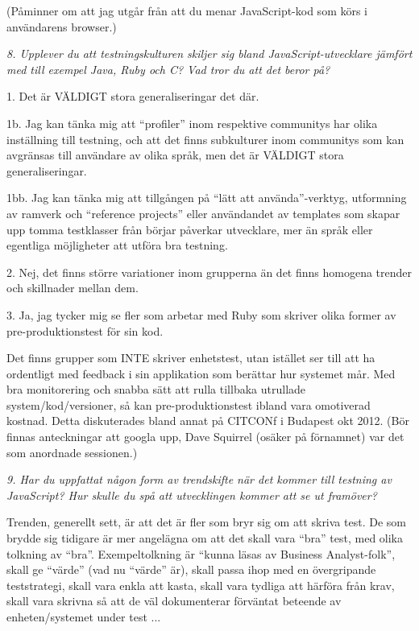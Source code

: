 \documentclass[11pt]{article}
\begin{document}
(Påminner om att jag utgår från att du menar JavaScript-kod som körs i
användarens browser.)

\emph{8. Upplever du att testningskulturen skiljer sig bland
JavaScript-utvecklare jämfört med till exempel Java, Ruby och C\nolinebreak\hspace{-.05em}\raisebox{.3ex}{\scriptsize\bf \#}? Vad
tror du att det beror på?}

1. Det är VÄLDIGT stora generaliseringar det där.

1b. Jag kan tänka mig att ``profiler'' inom respektive communitys har
olika inställning till testning, och att det finns subkulturer inom
communitys som kan avgränsas till användare av olika språk, men det är
VÄLDIGT stora generaliseringar.

1bb. Jag kan tänka mig att tillgången på ``lätt att använda''-verktyg,
utformning av ramverk och ``reference projects'' eller användandet av
templates som skapar upp tomma testklasser från börjar påverkar
utvecklare, mer än språk eller egentliga möjligheter att utföra bra
testning.

2. Nej, det finns större variationer inom grupperna än det finns
homogena trender och skillnader mellan dem.

3. Ja, jag tycker mig se fler som arbetar med Ruby som skriver olika
former av pre-produktionstest för sin kod.

Det finns grupper som INTE skriver enhetstest, utan istället ser till
att ha ordentligt med feedback i sin applikation som berättar hur
systemet mår. Med bra monitorering och snabba sätt att rulla tillbaka
utrullade system/kod/versioner, så kan pre-produktionstest ibland vara
omotiverad kostnad. Detta diskuterades bland annat på CITCONf i Budapest
okt 2012. (Bör finnas anteckningar att googla upp, Dave Squirrel (osäker
på förnamnet) var det som anordnade sessionen.)

\emph{9. Har du uppfattat någon form av trendskifte när det kommer till
testning av JavaScript? Hur skulle du spå att utvecklingen kommer att
se ut framöver?}

Trenden, generellt sett, är att det är fler som bryr sig om att skriva
test. De som brydde sig tidigare är mer angelägna om att det skall vara
``bra'' test, med olika tolkning av ``bra''. Exempeltolkning är ``kunna läsas
av Business Analyst-folk'', skall ge ``värde'' (vad nu ``värde'' är), skall
passa ihop med en övergripande teststrategi, skall vara enkla att kasta,
skall vara tydliga att härföra från krav, skall vara skrivna så att de
väl dokumenterar förväntat beteende av enheten/systemet under test ...
\end{document}
